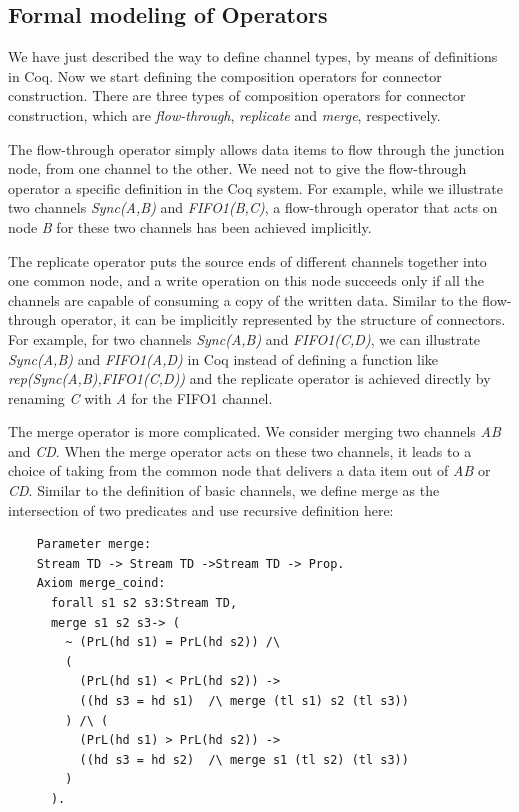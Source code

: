 \documentclass[3p,times]{elsarticle}
\begin{document}
\subsection{Formal modeling of Operators}
We have just described the way to define channel types, by means of definitions in Coq. Now we start defining the composition operators for connector construction. There are three types of composition operators for connector construction, which are \emph{flow-through}, \emph{replicate} and \emph{merge}, respectively.

The flow-through operator simply allows data items to flow through the junction node, from one channel to the other. We need not to give the flow-through operator a specific definition in the Coq system. For example, while we illustrate two channels \emph{Sync(A,B)} and \emph{FIFO1(B,C)}, a flow-through operator that acts on node \emph{B} for these two channels has been achieved implicitly.

The replicate operator puts the source ends of different channels together into one common node, and a write operation on this node succeeds only if all the channels are capable of consuming a copy of the written data. %
Similar to the flow-through operator, it can be implicitly represented by the structure of connectors. For example, for two channels \emph{Sync(A,B)} and \emph{FIFO1(C,D)}, we can illustrate \emph{Sync(A,B)} and \emph{FIFO1(A,D)} in Coq instead of defining a function like \emph{rep(Sync(A,B),FIFO1(C,D))} and the replicate operator is achieved directly by renaming \emph{C} with \emph{A} for the FIFO1 channel.

The merge operator is more complicated. We consider merging two
channels \emph{AB} and \emph{CD}. When the merge operator acts on
these two channels, it leads to a choice of taking from the common
node that delivers a data item out of \emph{AB} or \emph{CD}.
Similar to the definition of basic channels, we define merge as the intersection of two predicates and use recursive definition here:
\begin{verbatim}
    Parameter merge:
    Stream TD -> Stream TD ->Stream TD -> Prop.
    Axiom merge_coind:
      forall s1 s2 s3:Stream TD,
      merge s1 s2 s3-> (
        ~ (PrL(hd s1) = PrL(hd s2)) /\
        (
          (PrL(hd s1) < PrL(hd s2)) ->
          ((hd s3 = hd s1)  /\ merge (tl s1) s2 (tl s3))
        ) /\ (
          (PrL(hd s1) > PrL(hd s2)) ->
          ((hd s3 = hd s2)  /\ merge s1 (tl s2) (tl s3))
        )
      ).
\end{verbatim}
\end{document}
